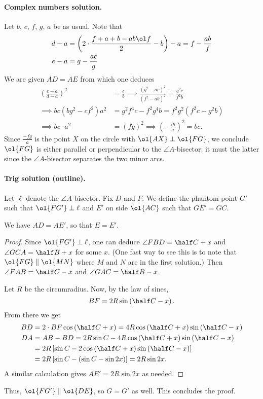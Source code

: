 \paragraph{Complex numbers solution.}
Let $b$, $c$, $f$, $g$, $a$ be as usual.
Note that
\begin{align*}
  d-a &= \left( 2 \cdot \frac{f+a+b-ab\ol f}{2} -b \right)-a
    = f - \frac{ab}{f} \\
  e-a &= g - \frac{ac}{g}
\end{align*}
We are given $AD = AE$ from which one deduces
\begin{align*}
  \left( \frac{e-a}{d-a} \right)^2 &= \frac cb
  \implies \frac{(g^2-ac)^2}{(f^2-ab)^2} = \frac{g^2 c}{f^2 b} \\
  \implies bc(bg^2-cf^2)a^2 &= g^2f^4c - f^2g^4b = f^2g^2(f^2c-g^2b) \\
  \implies bc \cdot a^2 &= (fg)^2 \implies \left( -\frac{fg}{a} \right)^2 = bc.
\end{align*}
Since $\frac{-fg}{a}$ is the point $X$ on the circle
with $\ol{AX} \perp \ol{FG}$,
we conclude $\ol{FG}$ is either parallel or perpendicular
to the $\angle A$-bisector; it must the latter
since the $\angle A$-bisector separates the two minor arcs.

\paragraph{Trig solution (outline).}
Let $\ell$ denote the $\angle A$ bisector.
Fix $D$ and $F$.
We define the phantom point $G'$ such that $\ol{FG'} \perp \ell$
and $E'$ on side $\ol{AC}$ such that $GE'=GC$.
\begin{claim*}
  We have $AD = AE'$, so that $E = E'$.
\end{claim*}
\begin{proof}
  Since $\ol{FG'} \perp \ell$,
  one can deduce $\angle FBD = \half C + x$
  and $\angle GCA = \half B + x$ for some $x$.
  (One fast way to see this is to note that $\ol{FG} \parallel \ol{MN}$
  where $M$ and $N$ are in the first solution.)
  Then $\angle FAB = \half C -x$ and $\angle GAC = \half B - x$.

  Let $R$ be the circumradius.
  Now, by the law of sines,
  \[ BF = 2R \sin\left( \half C - x \right). \]
  From there we get
  \begin{align*}
  BD &= 2 \cdot BF \cos\left(\half C + x\right)
    = 4R \cos\left(\half C+x\right) \sin \left(\half C-x\right) \\
  DA &= AB - BD = 2R\sin C
    - 4R\cos\left(\half C+x\right) \sin\left(\half C -x\right) \\
  &= 2R\left[ \sin C - 2\cos\left( \half C + x \right) \sin \left( \half C -x \right) \right] \\
  &= 2R\left[ \sin C - \left( \sin C - \sin 2x  \right) \right]
  = 2R \sin 2x.
  \end{align*}
  A similar calculation gives $AE' = 2R \sin 2x$ as needed.
\end{proof}
Thus, $\ol{FG'} \parallel \ol{DE}$, so $G = G'$ as well.
This concludes the proof.

